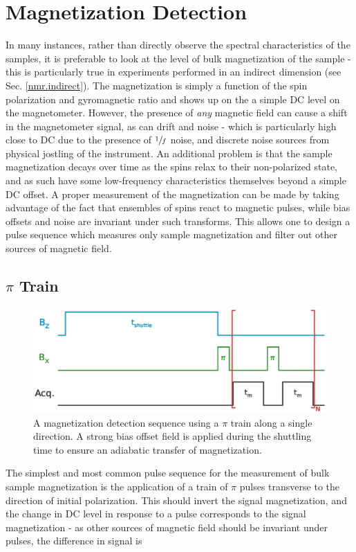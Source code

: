 \documentclass[PaulGanssle-Thesis.tex]{subfiles}
\begin{document}
\section{Magnetization Detection}
\label{nmr.signal.magnetization}
In many instances, rather than directly observe the spectral characteristics of the samples, it is preferable to look at the level of bulk magnetization of the sample - this is particularly true in experiments performed in an indirect dimension (see Sec. \ref{nmr.indirect}). The magnetization is simply a function of the spin polarization and gyromagnetic ratio and shows up on the a simple DC level on the magnetometer. However, the presence of \textit{any} magnetic field can cause a shift in the magnetometer signal, as can drift and noise - which is particularly high close to DC due to the presence of $\sfrac{1}{f}$ noise, and discrete noise sources from physical jostling of the instrument. An additional problem is that the sample magnetization decays over time as the spins relax to their non-polarized state, and as such have some low-frequency characteristics themselves beyond a simple DC offset. A proper measurement of the magnetization can be made by taking advantage of the fact that ensembles of spins react to magnetic pulses, while bias offsets and noise are invariant under such transforms. This allows one to design a pulse sequence which measures only sample magnetization and filter out other sources of magnetic field.

\subsection{$\pi$ Train}
\label{nmr.signal.magnetization.pitrain}
\begin{figure}[h!]
\includegraphics[width=\tw]{figures/relaxometry/acq_sequence_diagram.eps}
\caption{A magnetization detection sequence using a $\pi$ train along a single direction. A strong bias offset field is applied during the shuttling time to ensure an adiabatic transfer of magnetization.}
\label{fig:PiTrainDetection}
\end{figure}
The simplest and most common pulse sequence for the measurement of bulk sample magnetization is the application of a train of $\pi$ pulses transverse to the direction of initial polarization. This should invert the signal magnetization, and the change in DC level in response to a pulse corresponds to the signal magnetization - as other sources of magnetic field should be invariant under pulses, the difference in signal is
\end{document}
